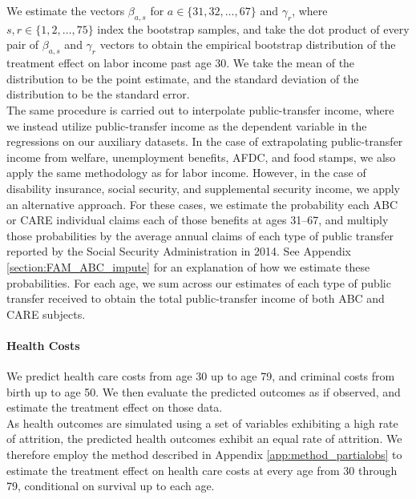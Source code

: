 \noindent We estimate the vectors $\beta_{a, s}$ for $a \in \{31, 32, \dots, 67\}$ and $\gamma_r$, where
$s,r \in \{1,2,\dots,75\}$ index the bootstrap samples, and take the dot product of every pair of
$\beta_{a,s}$ and $\gamma_r$ vectors to obtain the empirical bootstrap distribution of the treatment
effect on labor income past age 30. We take the mean of the distribution to be the point estimate,
and the standard deviation of the distribution to be the standard error. \\


\noindent The same procedure is carried out to interpolate public-transfer income, where we instead utilize public-transfer
income as the dependent variable in the regressions on our auxiliary datasets. In the case of
extrapolating public-transfer income from welfare, unemployment benefits, AFDC, and food stamps, we also apply
the same methodology as for labor income. However, in the case of disability insurance, social
security, and supplemental security income, we apply an alternative approach. For these cases, we estimate
the probability each ABC or CARE individual claims each of those benefits at ages 31--67, and multiply those
probabilities by the average annual claims of each type of public transfer reported by the Social
Security Administration in 2014. See Appendix \ref{section:FAM_ABC_impute}
for an explanation of how we estimate these probabilities. For each age, we sum across our estimates of
each type of public transfer received to obtain the total public-transfer income of both ABC and CARE subjects. \\


\paragraph{Health Costs}

\noindent We predict health care costs from age 30 up to age 79, and criminal costs from birth
up to age 50. We then evaluate the predicted outcomes as if observed, and estimate the
treatment effect on those data.\\

\noindent As health outcomes are simulated using a set of variables exhibiting a high rate of attrition, the
predicted health outcomes exhibit an equal rate of attrition. We therefore employ the method described
in Appendix \ref{app:method_partialobs} to estimate the treatment effect on health care costs at
every age from 30 through 79, conditional on survival up to each age. \\

